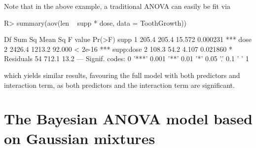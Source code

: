 Note that in the above example, a traditional ANOVA can easily be fit via

\begin{example}
R> summary(aov(len ~ supp * dose, data = ToothGrowth))

            Df Sum Sq Mean Sq F value   Pr(>F)    
supp         1  205.4   205.4  15.572 0.000231 ***
dose         2 2426.4  1213.2  92.000  < 2e-16 ***
supp:dose    2  108.3    54.2   4.107 0.021860 *  
Residuals   54  712.1    13.2                     
---
Signif. codes:  0 '***' 0.001 '**' 0.01 '*' 0.05 '.' 0.1 ' ' 1
\end{example}
which yields similar results, favouring the full model with both predictors and interaction term, as both predictors and the interaction term are significant.


\section{The Bayesian ANOVA model based on Gaussian mixtures }


